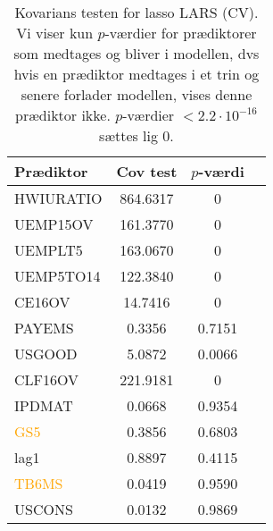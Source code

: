 \begin{table}[ht] 
\centering 
\begin{tabular}{lccc}
\toprule
Prædiktor & Cov test & \(p\)-værdi \\
\midrule
 \textcolor{blue3}{HWIURATIO}  &   864.6317 & 0 \\
 \textcolor{blue3}{UEMP15OV}  &   161.3770&  0 \\
 \textcolor{blue3}{UEMPLT5} &  163.0670 & 0 \\
 \textcolor{blue3}{UEMP5TO14}  &   122.3840  &0 \\
 \textcolor{blue3}{CE16OV} & 14.7416  &0 \\
 \textcolor{blue3}{PAYEMS} &  0.3356  &0.7151 \\
  \textcolor{blue3}{USGOOD}  &   5.0872 & 0.0066 \\
 \textcolor{blue3}{CLF16OV}    &   221.9181 & 0 \\
\textcolor{chartreuse4}{IPDMAT}       &    0.0668&  0.9354 \\
\textcolor{orange}{GS5}   &       0.3856 &    0.6803 \\
 \textcolor{blue3}{ lag1 }  &      0.8897 &    0.4115 \\
\textcolor{orange}{ TB6MS }&       0.0419   &  0.9590 \\
 \textcolor{blue3}{USCONS }&   0.0132   &  0.9869 \\ 
\bottomrule
\end{tabular}

\caption{Kovarians testen for lasso LARS (CV).
Vi viser kun \(p\)-værdier for prædiktorer som medtages og bliver i modellen, dvs hvis en prædiktor medtages i et trin og senere forlader modellen, vises denne prædiktor ikke.
\(p\)-værdier \(< 2.2 \cdot 10^{-16}\) sættes lig 0.} \label{tab:covTest}
\end{table} 
